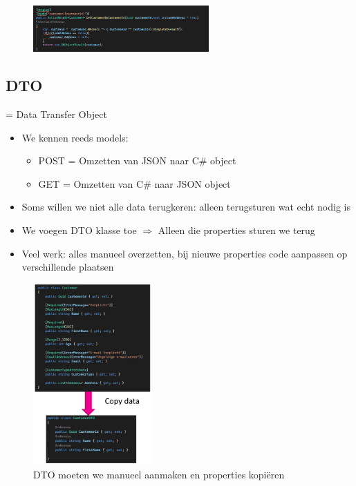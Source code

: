 \documentclass{article}
\begin{document}
\begin{figure}[H]
    \centering
    \includegraphics[width=0.6\textwidth]{querystring.png}
    \caption{}
\end{figure}

\subsection{DTO}

= Data Transfer Object

\begin{itemize}
    \item We kennen reeds models:
    \begin{itemize}
        \item POST = Omzetten van JSON naar C\# object 
        \item GET = Omzetten van C\# naar JSON object
    \end{itemize}
    \item Soms willen we niet alle data terugkeren: alleen terugsturen wat echt nodig is
    \item We voegen DTO klasse toe $\Rightarrow$ Alleen die properties sturen we terug
    \item Veel werk: alles manueel overzetten, bij nieuwe properties code aanpassen op verschillende plaatsen
\end{itemize}

\begin{figure}[H]
    \centering
    \includegraphics[width=0.4\textwidth]{dto.png}
    \caption{DTO moeten we manueel aanmaken en properties kopiëren}
\end{figure}
\end{document}
